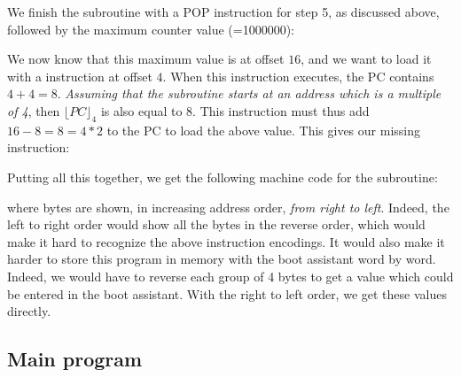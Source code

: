 We finish the subroutine with a POP instruction for step 5, as discussed above,
followed by the maximum counter value (=1000000):


\noindent We now know that this maximum value is at offset $16$, and we want to
load it with a  instruction at offset $4$. When this instruction
executes, the PC contains $4+4=8$. {\em Assuming that the subroutine starts at
an address which is a multiple of 4}, then $\lfloor PC \rfloor_4$ is also equal
to $8$. This instruction must thus add $16-8=8=4*2$ to the PC to load the above
value. This gives our missing  instruction:


Putting all this together, we get the following machine code for the subroutine:


\noindent where bytes are shown, in increasing address order, {\em from right
to left}. Indeed, the left to right order would show all the bytes in the
reverse order, which would make it hard to recognize the above instruction
encodings. It would also make it harder to store this program in memory with
the boot assistant word by word. Indeed, we would have to reverse each group of
4 bytes to get a value which could be entered in the boot assistant. With the
right to left order, we get these values directly.

\subsection{Main program}\label{subsection:blink-led-main}

